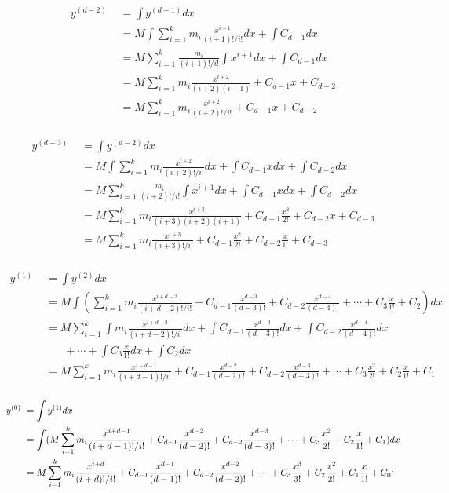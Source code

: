 \documentclass[11pt]{amsart}
\theoremstyle{remark}
\theoremstyle{definition}
\theoremstyle{remark}
\numberwithin{equation}{section}
\begin{document}
\begin{align*}
y^{(d-2)}	& \,\, =  \int y^{(d-1)} dx\\
& \,\, = M  \int \sum_{i=1}^{k}  m_i   \frac{x^{i+1}}{(i+1)!/i!} dx + \int C_{d-1} dx\\
& \,\, = M   \sum_{i=1}^{k}    \frac{m_i}{(i+1)!/i!} \int x^{i+1} dx + \int C_{d-1} dx\\
& \,\, = M   \sum_{i=1}^{k}  m_i   \frac{x^{i+2}}{(i+2)(i+1)} + C_{d-1} x+ C_{d-2}\\
& \,\, = M   \sum_{i=1}^{k}  m_i   \frac{x^{i+2}}{(i+2)!/i!} + C_{d-1}x+C_{d-2}\\
\end{align*}	


\begin{align*}
y^{(d-3)}	& \,\, =  \int y^{(d-2)} dx\\
& \,\, = M   \int  \sum_{i=1}^{k}  m_i   \frac{x^{i+2}}{(i+2)!/i!} dx + \int C_{d-1} x dx + \int C_{d-2} dx\\
& \,\, = M  \sum_{i=1}^{k}    \frac{m_i}{(i+2)!/i!} \int x^{i+1} dx + \int C_{d-1} x dx + \int C_{d-2} dx\\
& \,\, = M   \sum_{i=1}^{k}  m_i   \frac{x^{i+3}}{(i+3)(i+2)(i+1)} + C_{d-1} \frac{x^2}{2!} + C_{d-2}x + C_{d-3}\\
& \,\, = M   \sum_{i=1}^{k}  m_i   \frac{x^{i+3}}{(i+3)!/i!} + C_{d-1} \frac{x^2}{2!} + C_{d-2}\frac{x}{1!} + C_{d-3}\\
\end{align*}	


\begin{align*}
y^{(1)}	& \,\, =  \int y^{(2)} dx\\
& \,\, = M  \int  (\sum_{i=1}^{k}  m_i   \frac{x^{i+d-2}}{(i+d-2)!/i!} +  C_{d-1} \frac{x^{d-3}}{(d-3)!}+C_{d-2} \frac{x^{d-4}}{(d-4)!} + \cdots + C_3 \frac{x}{1!}+ C_2) dx\\
& \,\, = M   \sum_{i=1}^{k}   \int  m_i  \frac{x^{i+d-2}}{(i+d-2)!/i!} dx + \int C_{d-1} \frac{x^{d-3}}{(d-3)!} dx + \int C_{d-2} \frac{x^{d-4}}{(d-4)!} dx \\
& \quad \quad + \cdots + \int C_3 \frac{x}{1!} dx + \int C_2 dx\\
& \,\, = M   \sum_{i=1}^{k}    m_i  \frac{x^{i+d-1}}{(i+d-1)!/i!}  +  C_{d-1} \frac{x^{d-2}}{(d-2)!}  +  C_{d-2} \frac{x^{d-3}}{(d-3)!} + \cdots +  C_3 \frac{x^2}{2!}  +  C_2 \frac{x}{1!} +C_1\\
\end{align*}	

\begin{align*}
y^{(0)}	& \,\, =  \int y^{(1)} dx\\
& \,\, = \int( M    \sum_{i=1}^{k}    m_i  \frac{x^{i+d-1}}{(i+d-1)!/i!}  +  C_{d-1} \frac{x^{d-2}}{(d-2)!}  +  C_{d-2} \frac{x^{d-3}}{(d-3)!} + \cdots +  C_3 \frac{x^2}{2!}  +  C_2 \frac{x}{1!} +C_1) dx\\
& \,\, =  M    \sum_{i=1}^{k}    m_i  \frac{x^{i+d}}{(i+d)!/i!}  +  C_{d-1} \frac{x^{d-1}}{(d-1)!}  +  C_{d-2} \frac{x^{d-2}}{(d-2)!} + \cdots +  C_3 \frac{x^3}{3!}  +  C_2 \frac{x^2}{2!} +  C_1 \frac{x}{1!} +C_0`\\
\end{align*}	
\end{document}
